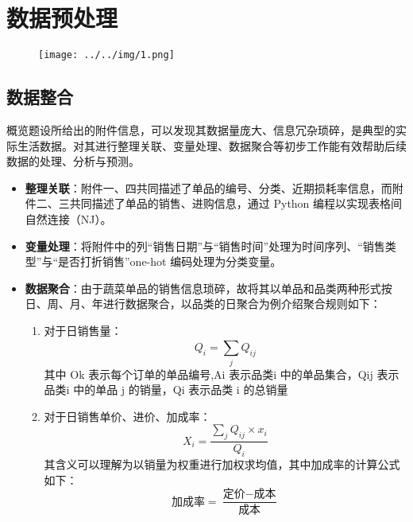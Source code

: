 \documentclass[withoutpreface,bwprint]{cumcmthesis} %
\begin{document}
\section{数据预处理}

\begin{figure}[H]
	\small
	\centering
	\texttt{[image: ../../img/1.png]}
\end{figure}

\subsection{数据整合}

概览题设所给出的附件信息，可以发现其数据量庞大、信息冗杂琐碎，是典型的实际生活数据。对其进行整理关联、变量处理、数据聚合等初步工作能有效帮助后续数据的处理、分析与预测。

\begin{itemize}
    \item \textbf{整理关联}：附件一、四共同描述了单品的编号、分类、近期损耗率信息，而附件二、三共同描述了单品的销售、进购信息，通过 Python 编程以实现表格间自然连接（NJ）。
    \item \textbf{变量处理}：将附件中的列“销售日期”与“销售时间”处理为时间序列、“销售类型”与“是否打折销售”one-hot 编码处理为分类变量。
    \item \textbf{数据聚合}：由于蔬菜单品的销售信息琐碎，故将其以单品和品类两种形式按日、周、月、年进行数据聚合，以品类的日聚合为例介绍聚合规则如下：
    \begin{enumerate}[label=(\alph*)]
		\item 对于日销售量：
		\begin{equation}
			Q_i=\sum_j^{}{Q_{ij}}
		\end{equation}
		其中 Ok 表示每个订单的单品编号,Ai 表示品类i 中的单品集合，Qij 表示品类i 中的单品 j 的销量，Qi 表示品类 i 的总销量
		\item 对于日销售单价、进价、加成率：
		\begin{equation}
			X_i=\frac{\sum_j^{}{Q_{ij}\times x_i}}{Q_i}
		\end{equation}
		其含义可以理解为以销量为权重进行加权求均值，其中加成率的计算公式如下：
		\begin{equation}
			\text{加成率}=\frac{\text{定价}-\text{成本}}{\text{成本}}
		\end{equation}

	\end{enumerate}


\end{itemize}
\end{document}
